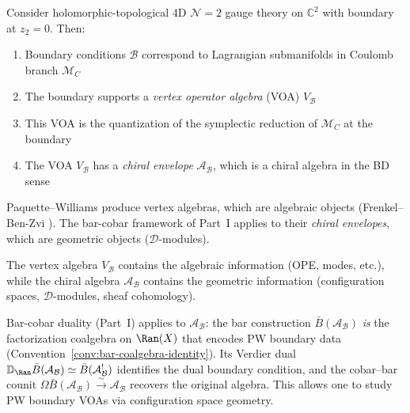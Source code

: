 \begin{theorem}\label{thm:paquette-williams-boundaries}
\cite{PW22} Consider holomorphic-topological 4D $\mathcal{N}=2$ gauge theory on 
$\mathbb{C}^2$ with boundary at $z_2 = 0$. Then:
\begin{enumerate}
\item Boundary conditions $\mathcal{B}$ correspond to Lagrangian submanifolds in 
      Coulomb branch $\mathcal{M}_C$
      
\item The boundary supports a \emph{vertex operator algebra} (VOA) $V_{\mathcal{B}}$

\item This VOA is the quantization of the symplectic reduction of $\mathcal{M}_C$ 
      at the boundary
      
\item The VOA $V_{\mathcal{B}}$ has a \emph{chiral envelope} $\mathcal{A}_{\mathcal{B}}$,
      which is a chiral algebra in the BD sense
\end{enumerate}
\end{theorem}

\begin{remark}\label{rem:PW-connection}
Paquette--Williams produce vertex algebras, which are algebraic objects (Frenkel--Ben-Zvi
\cite{FBZ04}). The bar-cobar framework of Part~I applies to their \emph{chiral envelopes}, which are
geometric objects ($\mathcal{D}$-modules).

\begin{center}
\end{center}

The vertex algebra $V_{\mathcal{B}}$ contains the algebraic information (OPE, modes, 
etc.), while the chiral algebra $\mathcal{A}_{\mathcal{B}}$ contains the geometric 
information (configuration spaces, $\mathcal{D}$-modules, sheaf cohomology).

Bar-cobar duality (Part~I) applies to $\mathcal{A}_{\mathcal{B}}$: the bar construction $\bar{B}(\mathcal{A}_{\mathcal{B}})$ \emph{is} the factorization coalgebra on $\Ran(X)$ that encodes PW boundary data (Convention~\ref{conv:bar-coalgebra-identity}).  Its Verdier dual $\mathbb{D}_{\Ran}\bar{B}(\mathcal{A}_{\mathcal{B}}) \simeq \bar{B}(\mathcal{A}_{\mathcal{B}}^!)$ identifies the dual boundary condition, and the cobar--bar counit $\Omega\bar{B}(\mathcal{A}_{\mathcal{B}}) \xrightarrow{\sim} \mathcal{A}_{\mathcal{B}}$ recovers the original algebra.  This allows one to study PW boundary VOAs via configuration space geometry.
\end{remark}

